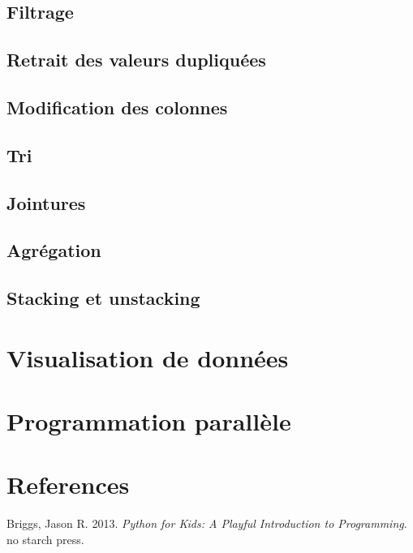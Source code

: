 \documentclass[12pt,]{book}
\numberwithin{equation}{section}
\numberwithin{countremarque}{section}
\begin{document}
\section{Filtrage}\label{filtrage}

\section{Retrait des valeurs
dupliquées}\label{retrait-des-valeurs-dupliquees}

\section{Modification des colonnes}\label{modification-des-colonnes}

\section{Tri}\label{tri-1}

\section{Jointures}\label{jointures}

\section{Agrégation}\label{agregation}

\section{Stacking et unstacking}\label{stacking-et-unstacking}

\chapter{Visualisation de données}\label{visualisation-de-donnees}

\chapter{Programmation parallèle}\label{programmation-parallele}

\chapter{References}\label{references}

\hypertarget{refs}{}
\hypertarget{ref-briggs_2013_python}{}
Briggs, Jason R. 2013. \emph{Python for Kids: A Playful Introduction to
Programming}. no starch press.
\end{document}
